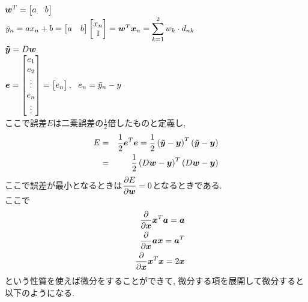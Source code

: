 \documentclass[dvipdfmx,a4j]{jsarticle}
\begin{document}
$\mbox{\boldmath $w$}^{T} = \begin{bmatrix} a&b \end{bmatrix}$\\
$\tilde{y}_{n} = ax_{n}+b = \begin{bmatrix} a&b \end{bmatrix} \begin{bmatrix} x_{n}\\1 \end{bmatrix}=\mbox{\boldmath $w$}^{T}\mbox{\boldmath $x$}_{n} = \displaystyle \sum_{k=1}^{2}w_{k}\cdot d_{nk}$\\
$\mbox{\boldmath $\tilde{y}$} = D\mbox{\boldmath $w$}$\\
$\mbox{\boldmath $e$}=\begin{bmatrix}e_{1}\\e_{2}\\\vdots \\ e_{n}\\ \vdots \end{bmatrix}=\begin{bmatrix}e_{n}\end{bmatrix},\ \ e_{n}=\tilde{y}_{n}-y$\\
ここで誤差$E$は二乗誤差の$\displaystyle \frac{1}{2}$倍したものと定義し,
\begin{eqnarray*}
    E&=&\frac{1}{2}\mbox{\boldmath $e$}^{T} \mbox{\boldmath $e$} = \frac{1}{2}\left(\mbox{\boldmath $\tilde{y}$} -\mbox{\boldmath $y$} \right)^{T}\left(\mbox{\boldmath $\tilde{y}$} -\mbox{\boldmath $y$} \right)\\
    &=&\frac{1}{2}\left(D\mbox{\boldmath $w$}-\mbox{\boldmath $y$}\right)^{T}\left(D\mbox{\boldmath $w$}-\mbox{\boldmath $y$}\right)
\end{eqnarray*}
ここで誤差が最小となるときは$\displaystyle \frac{\partial E}{\partial \mbox{\boldmath $w$}}=0$となるときである.\\
ここで
\begin{eqnarray*}
    &&\frac{\partial}{\partial \mbox{\boldmath $x$}} \mbox{\boldmath $x$}^{T}\mbox{\boldmath $a$} = \mbox{\boldmath $a$}\\
    &&\frac{\partial}{\partial \mbox{\boldmath $x$}} \mbox{\boldmath $a$}\mbox{\boldmath $x$} = \mbox{\boldmath $a$}^{T}\\
    &&\frac{\partial}{\partial \mbox{\boldmath $x$}}\mbox{\boldmath $x$}^{T}\mbox{\boldmath $x$}=2\mbox{\boldmath $x$}
\end{eqnarray*}
という性質を使えば微分をすることができて, 微分する項を展開して微分すると以下のようになる.
\end{document}
